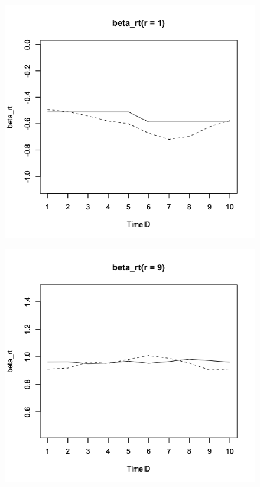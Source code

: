 \documentclass[a4paper,11pt,oneside,openany]{jsbook}
\begin{document}
\clearpage
\begin{figure}[tb]
 \begin{minipage}[tb]{0.3\linewidth}
  \centering
  \includegraphics[keepaspectratio,scale=0.25]{img/beta_rt_param_1.png}
  \label{ICC1}
 \end{minipage}
 \begin{minipage}[tb]{0.3\linewidth}
  \centering
  \includegraphics[keepaspectratio,scale=0.25]{img/beta_rt_param_9.png}

\end{minipage}
\end{figure}
\end{document}
